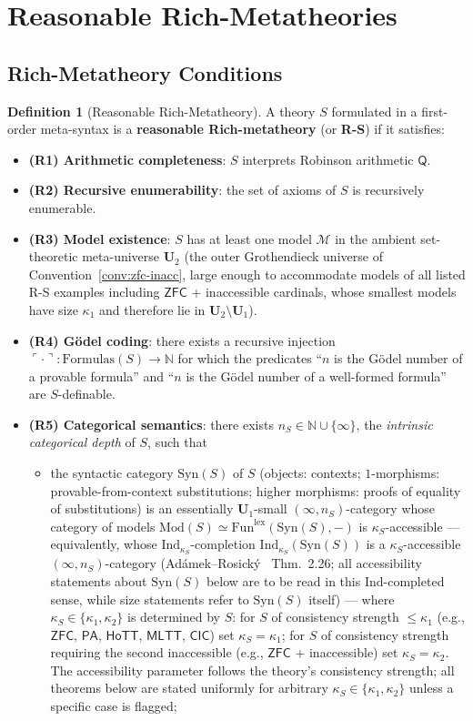\documentclass[11pt]{article}
\theoremstyle{plain}
\theoremstyle{definition}
\newtheorem{definition}[theorem]{Definition}
\newcommand{\cM}{\mathcal{M}}
\newcommand{\Fun}{\mathrm{Fun}}
\newcommand{\Syn}{\mathrm{Syn}}
\newcommand{\Mod}{\mathrm{Mod}}
\newcommand{\PA}{\mathsf{PA}}
\newcommand{\ZFC}{\mathsf{ZFC}}
\newcommand{\MLTT}{\mathsf{MLTT}}
\newcommand{\HoTT}{\mathsf{HoTT}}
\newcommand{\CIC}{\mathsf{CIC}}
\begin{document}
\section{Reasonable Rich-Metatheories}\label{sec:rs}

\subsection{Rich-Metatheory Conditions}

\begin{definition}[Reasonable Rich-Metatheory]\label{def:rs}
A theory $S$ formulated in a first-order meta-syntax is a \textbf{reasonable Rich-metatheory} (or \textbf{R-S}) if it satisfies:
\begin{itemize}
\item \textbf{(R1) Arithmetic completeness}: $S$ interprets Robinson arithmetic $\mathsf{Q}$.
\item \textbf{(R2) Recursive enumerability}: the set of axioms of $S$ is recursively enumerable.
\item \textbf{(R3) Model existence}: $S$ has at least one model $\cM$ in the ambient set-theoretic meta-universe $\mathbf{U}_2$ (the outer Grothendieck universe of Convention~\ref{conv:zfc-inacc}, large enough to accommodate models of all listed R-S examples including $\ZFC$ + inaccessible cardinals, whose smallest models have size $\kappa_1$ and therefore lie in $\mathbf{U}_2 \setminus \mathbf{U}_1$).
\item \textbf{(R4) G\"odel coding}: there exists a recursive injection $\ulcorner \cdot \urcorner : \mathrm{Formulas}(S) \to \mathbb{N}$ for which the predicates ``$n$ is the G\"odel number of a provable formula'' and ``$n$ is the G\"odel number of a well-formed formula'' are $S$-definable.
\item \textbf{(R5) Categorical semantics}: there exists $n_S \in \mathbb{N} \cup \{\infty\}$, the \emph{intrinsic categorical depth} of $S$, such that
\begin{itemize}
\item[\textbf{(R5a)}] the syntactic category $\Syn(S)$ of $S$ (objects: contexts; $1$-morphisms: provable-from-context substitutions; higher morphisms: proofs of equality of substitutions) is an essentially $\mathbf{U}_1$-small $(\infty, n_S)$-category whose category of models $\Mod(S) \simeq \Fun^{\mathrm{lex}}(\Syn(S), -)$ is $\kappa_S$-accessible --- equivalently, whose $\mathrm{Ind}_{\kappa_S}$-completion $\mathrm{Ind}_{\kappa_S}(\Syn(S))$ is a $\kappa_S$-accessible $(\infty, n_S)$-category (Ad\'amek--Rosick\'y~\cite{AdamekRosicky1994} Thm.~2.26; all accessibility statements about $\Syn(S)$ below are to be read in this $\mathrm{Ind}$-completed sense, while size statements refer to $\Syn(S)$ itself) --- where $\kappa_S \in \{\kappa_1, \kappa_2\}$ is determined by $S$: for $S$ of consistency strength $\leq \kappa_1$ (e.g., $\ZFC$, $\PA$, $\HoTT$, $\MLTT$, $\CIC$) set $\kappa_S = \kappa_1$; for $S$ of consistency strength requiring the second inaccessible (e.g., $\ZFC$ + inaccessible) set $\kappa_S = \kappa_2$. The accessibility parameter follows the theory's consistency strength; all theorems below are stated uniformly for arbitrary $\kappa_S \in \{\kappa_1, \kappa_2\}$ unless a specific case is flagged;

\end{itemize}
\end{itemize}
\end{definition}
\end{document}
